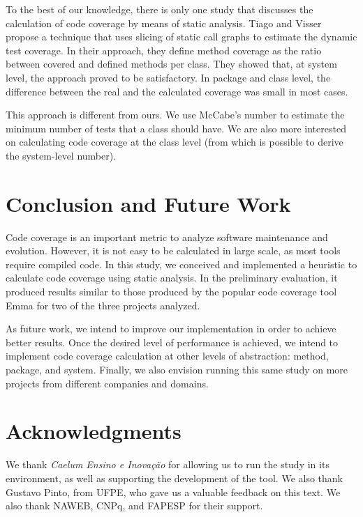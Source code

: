 \documentclass{sig-alternate}
\begin{document}
To the best of our knowledge, there is only one study that discusses the calculation of
code coverage by means of static analysis. Tiago and Visser \cite{tiago} propose a
technique that uses slicing of static call graphs to estimate the
dynamic test coverage. 
In their approach, they define method coverage as the ratio between covered 
and defined methods per class. They showed that, at system level, the approach
proved to be satisfactory. In package and class level, the difference between
the real and the calculated coverage was small in most cases.

This approach is different from ours. We use McCabe's number to estimate the
minimum number of tests that a class should have. We are also more interested on calculating
code coverage at the class level (from which is possible to derive the system-level number). 

\section{Conclusion and Future Work}
\label{sec-conclusion}

Code coverage is an important metric to analyze software maintenance and evolution. However, it is not easy to be calculated in large scale, as most tools require compiled code. In this study, we conceived and implemented a heuristic to calculate code coverage using static analysis. In the preliminary evaluation, it produced results similar to those produced by the popular code coverage tool Emma for two of the three projects analyzed. 

As future work, we intend to improve our implementation in order to
achieve better results. Once the desired level of performance is achieved, we intend to implement code coverage calculation at other levels of abstraction: method, package, and system. Finally, we also envision running this same study on more projects from different companies and domains.


\section{Acknowledgments}

We thank \textit{Caelum Ensino e Inovação} for allowing us to run the study in its environment,
as well as supporting the development of the tool. We also thank Gustavo Pinto, from UFPE, who
gave us a valuable feedback on this text. We also thank NAWEB, CNPq, and FAPESP for their support. 



\end{document}
